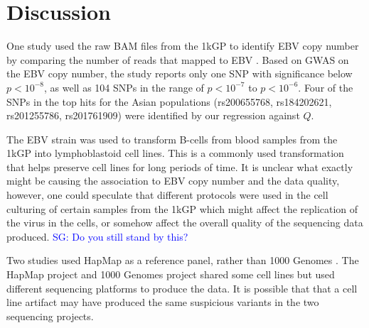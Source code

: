 \documentclass[9pt,lineno]{elife}
\newcommand{\sgcomment}[1]{\textcolor{blue}{SG: #1}}
\begin{document}
\section{Discussion}

One study used the raw BAM files from the 1kGP to identify EBV copy number by comparing the number of reads that mapped to EBV \citep{Mandage2017}.
Based on GWAS on the EBV copy number, the study reports only one SNP with significance below $ p < 10^{-8}$, as well as 104 SNPs in the range of $p < 10^{-7}$ to $ p < 10^{-6}$. 
Four of the SNPs in the top hits for the Asian populations (rs200655768, rs184202621, rs201255786, rs201761909) were identified by our regression against $Q$. 

The EBV strain was used to transform B-cells from blood samples from the 1kGP into lymphoblastoid cell lines.
This is a commonly used transformation that helps preserve cell lines for long periods of time.
It is unclear what exactly might be causing the association to EBV copy number and the data quality, however, one could speculate that different protocols were used in the cell culturing of certain samples from the 1kGP which might affect the replication of the virus in the cells, or somehow affect the overall quality of the sequencing data produced. \sgcomment{Do you still stand by this?}

Two studies used HapMap as a reference panel, rather than 1000 Genomes \citep{Kraja2011, Ebejer2013}. 
The HapMap project and 1000 Genomes project shared some cell lines but used different sequencing platforms to produce the data.
It is possible that that a cell line artifact may have produced the same suspicious variants in the two sequencing projects.
\end{document}
